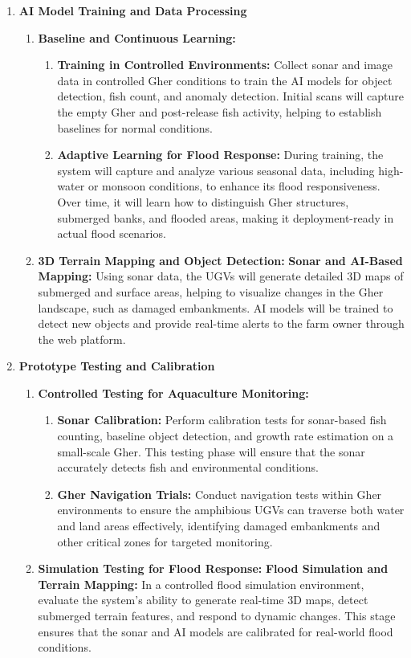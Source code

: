 \documentclass[conference]{IEEEtran}
\begin{document}
\begin{enumerate}
	\item \textbf{AI Model Training and Data Processing}
		\begin{enumerate}
			\item \textbf{Baseline and Continuous Learning:}
			\begin{enumerate}
				\item \textbf{Training in Controlled Environments:} Collect sonar and image data in controlled Gher conditions to train the AI models for object detection, fish count, and anomaly detection. Initial scans will capture the empty Gher and post-release fish activity, helping to establish baselines for normal conditions.
				\item \textbf{Adaptive Learning for Flood Response: }During training, the system will capture and analyze various seasonal data, including high-water or monsoon conditions, to enhance its flood responsiveness. Over time, it will learn how to distinguish Gher structures, submerged banks, and flooded areas, making it deployment-ready in actual flood scenarios.				
			\end{enumerate}
			\item \textbf{3D Terrain Mapping and Object Detection:}
			\textbf{Sonar and AI-Based Mapping: } 
			Using sonar data, the UGVs will generate detailed 3D maps of submerged and surface areas, helping to visualize changes in the Gher landscape, such as damaged embankments. AI models will be trained to detect new objects and provide real-time alerts to the farm owner through the web platform.		
		\end{enumerate}
	\item \textbf{Prototype Testing and Calibration}
		\begin{enumerate}
			\item \textbf{Controlled Testing for Aquaculture Monitoring: }
				\begin{enumerate}
					\item \textbf{Sonar Calibration: }Perform calibration tests for sonar-based fish counting, baseline object detection, and growth rate estimation on a small-scale Gher. This testing phase will ensure that the sonar accurately detects fish and environmental conditions.
					\item \textbf{Gher Navigation Trials:} Conduct navigation tests within Gher environments to ensure the amphibious UGVs can traverse both water and land areas effectively, identifying damaged embankments and other critical zones for targeted monitoring.
				\end{enumerate}
			\item \textbf{ Simulation Testing for Flood Response:}
			\textbf{ Flood Simulation and Terrain Mapping: }
			In a controlled flood simulation environment, evaluate the system’s ability to generate real-time 3D maps, detect submerged terrain features, and respond to dynamic changes. This stage ensures that the sonar and AI models are calibrated for real-world flood conditions.
		\end{enumerate}
	

\end{enumerate}
\end{document}
